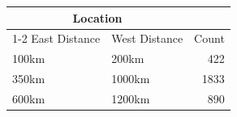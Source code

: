 \begin{tabular}{l l r}
  \toprule
  \multicolumn{2}{c}{Location} \\
  \cmidrule(r){1-2}
  East Distance & West Distance & Count \\
  \midrule
  100km & 200km & 422 \\
  350km & 1000km & 1833 \\
  600km & 1200km & 890 \\
  \bottomrule
\end{tabular}
